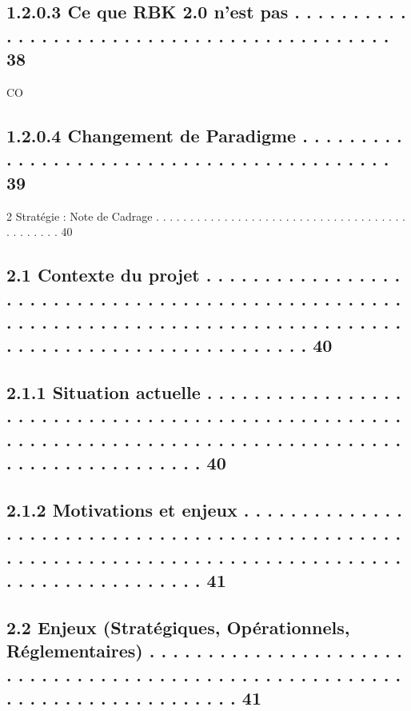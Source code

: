 \subsection{1.2.0.3 Ce que RBK 2.0 n’est pas . . . . . . . . . . . . . . . . . . . . . . . . . . . . . . . . . . . . . . . . . . .                                                                                                                       38}
CO\\
\subsection{1.2.0.4 Changement de Paradigme . . . . . . . . . . . . . . . . . . . . . . . . . . . . . . . . . . . . . . . . . .                                                                                                                          39}
2     Stratégie : Note de Cadrage . . . . . . . . . . . . . . . . . . . . . . . . . . . . . . . . . . . . . . . . . . . . . 40\\
\subsection{2.1     Contexte du projet . . . . . . . . . . . . . . . . . . . . . . . . . . . . . . . . . . . . . . . . . . . . . . . . . . . . . . . . . . . . . . . . . . . . . . . . . . . . . . . . . . . . . . . . . . . . . . . . . . . . . . . . . . . . . . . 40}
\subsection{2.1.1               Situation actuelle . . . . . . . . . . . . . . . . . . . . . . . . . . . . . . . . . . . . . . . . . . . . . . . . . . . . . . . . . . . . . . . . . . . . . . . . . . . . . . . . . . . . . . . . . . . . . . . . . . . . . . 40}
\subsection{2.1.2               Motivations et enjeux . . . . . . . . . . . . . . . . . . . . . . . . . . . . . . . . . . . . . . . . . . . . . . . . . . . . . . . . . . . . . . . . . . . . . . . . . . . . . . . . . . . . . . . . . . . . . . . . . . . 41}
\subsection{2.2     Enjeux (Stratégiques, Opérationnels, Réglementaires) . . . . . . . . . . . . . . . . . . . . . . . . . . . . . . . . . . . . . . . . . . . . . . . . . . . . . . . . . . . . . . . . . . . . . . . . . . . . 41}
